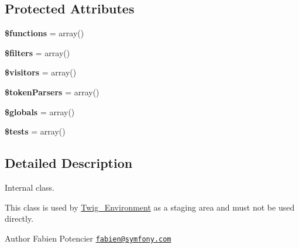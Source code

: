 \subsection*{Protected Attributes}
\begin{DoxyCompactItemize}
\item 
{\bfseries \$functions} = array()\hypertarget{classTwig__Extension__Staging_a0a791da15e98d455c51d46a114808b03}{}\label{classTwig__Extension__Staging_a0a791da15e98d455c51d46a114808b03}

\item 
{\bfseries \$filters} = array()\hypertarget{classTwig__Extension__Staging_acac7e34bf3e3bb35f79fdf562aff4fdf}{}\label{classTwig__Extension__Staging_acac7e34bf3e3bb35f79fdf562aff4fdf}

\item 
{\bfseries \$visitors} = array()\hypertarget{classTwig__Extension__Staging_a0c8e3428ed59bb2431dce9d3bf254833}{}\label{classTwig__Extension__Staging_a0c8e3428ed59bb2431dce9d3bf254833}

\item 
{\bfseries \$token\+Parsers} = array()\hypertarget{classTwig__Extension__Staging_ad10935442d87f0adb0b45e66cb736b06}{}\label{classTwig__Extension__Staging_ad10935442d87f0adb0b45e66cb736b06}

\item 
{\bfseries \$globals} = array()\hypertarget{classTwig__Extension__Staging_a07ec5733db846cfdb125919344252503}{}\label{classTwig__Extension__Staging_a07ec5733db846cfdb125919344252503}

\item 
{\bfseries \$tests} = array()\hypertarget{classTwig__Extension__Staging_a9eb908b365489c86cfd54b6215e55ddd}{}\label{classTwig__Extension__Staging_a9eb908b365489c86cfd54b6215e55ddd}

\end{DoxyCompactItemize}


\subsection{Detailed Description}
Internal class.

This class is used by \hyperlink{classTwig__Environment}{Twig\+\_\+\+Environment} as a staging area and must not be used directly.

\begin{DoxyAuthor}{Author}
Fabien Potencier \href{mailto:fabien@symfony.com}{\tt fabien@symfony.\+com} 
\end{DoxyAuthor}


